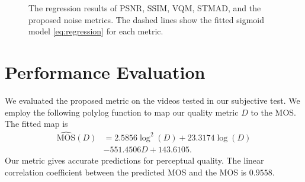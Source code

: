 \documentclass{sig-alternate}
\begin{document}
\begin{figure}
{}
\hspace*{1.7in}
\caption{\label{fig:fitting} The regression results of PSNR, SSIM, VQM, STMAD, and the proposed noise metrics. The dashed lines show the fitted sigmoid model \eqref{eq:regression} for each metric.}
\end{figure}


\section{Performance Evaluation}
\label{sec:experiment}
We evaluated the proposed metric on the videos tested in our subjective test. We employ the following polylog function to map our quality metric $D$ to the MOS. The fitted map is  
\begin{align*}
\label{eq:mos_mapping}
\mathrm{\hat{MOS}}(D) & = 2.5856\log^2(D) +23.3174\log(D) \\
&- 551.4506D + 143.6105.
\end{align*}
Our metric gives accurate predictions for perceptual quality. The linear correlation coefficient between the predicted MOS and the MOS is $0.9558$.
\end{document}
